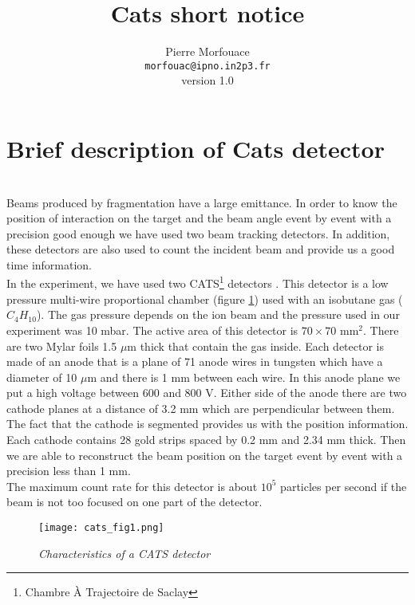 \documentclass[a4paper,12pt]{article}
\begin{document}
\title{\textbf{Cats short notice}}
\author{Pierre Morfouace\\
        \texttt{morfouac@ipno.in2p3.fr}\\
        version 1.0
}
\maketitle 

\pagebreak
\tableofcontents
\pagebreak


\section{Brief description of Cats detector}
~\\
\indent Beams produced by fragmentation have a large emittance. In order to know the position of interaction on the target and the beam angle event by event with a precision good enough we have used two beam tracking detectors. In addition, these detectors are also used to count the incident beam and provide us a good time information.\\
In the experiment, we have used two CATS\footnote{Chambre \`A Trajectoire de Saclay} detectors \cite{Ott}. This detector is a low pressure multi-wire proportional chamber (figure \ref{fig:CATS}) used with an isobutane gas ($C_4H_{10}$). The gas pressure depends on the ion beam and the pressure used in our experiment was 10 mbar. The active area of this detector is $70 \times 70$ mm$^2$. There are two Mylar foils 1.5 $\mu$m thick that contain the gas inside. Each detector is made of an anode that is a plane of 71 anode wires in tungsten which have a diameter of 10 $\mu$m and there is 1 mm between each wire. In this anode plane we put a high voltage between 600 and 800 V. Either side of the anode there are two cathode planes at a distance of 3.2 mm which are perpendicular between them. The fact that the cathode is segmented provides us with the position information. Each cathode contains 28 gold strips spaced by 0.2 mm and 2.34 mm thick. Then we are able to reconstruct the beam position on the target event by event with a precision less than 1 mm.\\
The maximum count rate for this detector is about $10^5$ particles per second if the beam is not too focused on one part of the detector.
\begin{figure}[h!]
\begin{center}
\texttt{[image: cats\_fig1.png]}
\caption{\textit{Characteristics of a CATS detector}}
\label{fig:CATS}
\end{center}
\end{figure}
\end{document}
